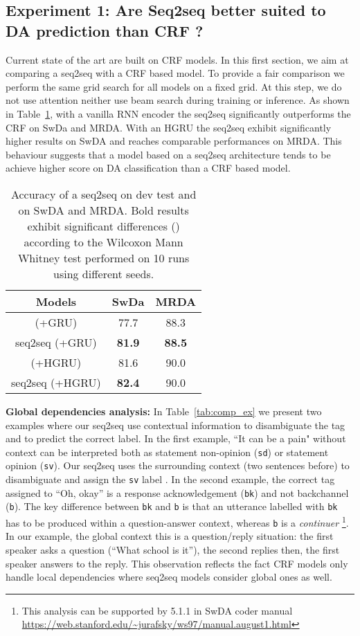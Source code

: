 \documentclass[letterpaper]{article} \usepackage{aaai20}  \usepackage{times}  \usepackage{helvet} \usepackage{courier}  \usepackage[hyphens]{url}  \usepackage{graphicx} \urlstyle{rm} \def\UrlFont{\rm}  \usepackage{graphicx}  \frenchspacing  \setlength{\pdfpagewidth}{8.5in}  \setlength{\pdfpageheight}{11in}
\begin{document}
\subsection{Experiment 1: Are Seq2seq better suited to DA prediction than CRF ?}
Current state of the art are built on CRF models. In this first section, we aim at comparing a seq2seq with a CRF based model. To provide a fair comparison we perform the same grid search for all models on a fixed grid. At this step, we do not use attention neither use beam search during training or inference. As shown in Table~\ref{tab:seq_vs_crf},  with a vanilla RNN encoder the seq2seq significantly outperforms the CRF on SwDa and MRDA. With an HGRU the seq2seq exhibit significantly higher results on SwDA and reaches comparable performances on MRDA. This behaviour suggests that a model based on a seq2seq architecture tends to be achieve higher score on DA classification than a CRF based model. 

\begin{table}[!htb]
\centering
\begin{tabular}{c|c|c}
\hline
    Models & SwDa & MRDA\\ 
    \hline
          (+GRU)  & 77.7 & 88.3\\ 
     seq2seq (+GRU) & \textbf{81.9}& \textbf{88.5}\\


    \hline
       (+HGRU)   & 81.6 & 90.0\\ 
     seq2seq (+HGRU) & \textbf{82.4}&90.0\\

     \hline
\end{tabular}
\caption{Accuracy of a seq2seq on dev test and  on SwDA and MRDA. Bold results exhibit significant differences () according to the Wilcoxon Mann Whitney test performed on 10 runs using different seeds. }
\label{tab:seq_vs_crf}
\end{table}

\noindent\textbf{Global dependencies analysis:} In Table~\ref{tab:comp_ex} we present two examples where our seq2seq use contextual information to disambiguate the tag and to predict the correct label. In the first example, ``It can be a pain" without context can be interpreted both as statement non-opinion (\texttt{sd}) or statement opinion (\texttt{sv}). Our seq2seq uses the surrounding context (two sentences before) to disambiguate and assign the \texttt{sv} label . In the second example, the correct tag assigned to ``Oh, okay'' is a response acknowledgement (\texttt{bk}) and not backchannel (\texttt{b}). The key difference between \texttt{bk} and \texttt{b} is that an utterance labelled with \texttt{bk} has to be produced within a question-answer context, whereas \texttt{b} is a \textit{continuer}
\footnote{This analysis can be supported by 5.1.1 in SwDA coder manual \url{https://web.stanford.edu/~jurafsky/ws97/manual.august1.html}}.
In our example, the global context this is a question/reply situation: the first speaker asks a question (``What school is it''), the second replies then, the first speaker answers to the reply. This observation reflects the fact CRF models only handle local dependencies where seq2seq models consider global ones as well.  
\end{document}
